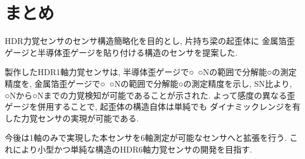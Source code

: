 \section{まとめ}
HDR力覚センサのセンサ構造簡略化を目的とし, 片持ち梁の起歪体に
金属箔歪ゲージと半導体歪ゲージを貼り付ける構造のセンサを提案した. 

製作したHDR1軸力覚センサは, 
半導体歪ゲージで○~○Nの範囲で分解能○の測定精度を, 
金属箔歪ゲージで○~○Nの範囲で分解能○の測定精度を示し, 
SN比より, ○Nから○Nまでの力覚検知が可能であることが示された.  
よって感度の異なる歪ゲージを併用することで, 起歪体の構造自体は単純でも
ダイナミックレンジを有した力覚センサの実現が可能である. 

今後は1軸のみで実現した本センサを6軸測定が可能なセンサへと拡張を行う. 
これにより小型かつ単純な構造のHDR6軸力覚センサの開発を目指す.